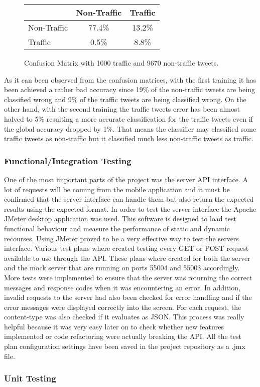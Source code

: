 \begin{figure}[h]
\begin{center}
    \begin{tabular}{| l || c | c | }
    \hline
          & Non-Traffic & Traffic \\ \hline \hline
        Non-Traffic & 77.4\% & 13.2\% \\ \hline
        Traffic & 0.5\% & 8.8\% \\ \hline
    \end{tabular}
    \caption{Confusion Matrix with 1000 traffic and 9670 non-traffic tweets.}
    \label{fig:confusionMatrix1}
\end{center}
\end{figure}
	
As it can been observed from the confusion matrices, with the first training it has been achieved a rather bad accuracy since 19\% of the non-traffic tweets are being classified wrong and 9\% of the traffic tweets are being classified wrong. On the other hand, with the second training the traffic tweets error has been almost halved to 5\% resulting a more accurate classification for the traffic tweets even if the global accuracy dropped by 1\%. That means the classifier may classified some traffic tweets as non-traffic but it classified much less non-traffic tweets as traffic.

\subsubsection{Functional/Integration Testing}
One of the most important parts of the project was the server API interface. A lot of requests will 
be coming from the mobile application and it must be confirmed that the server interface can handle 
them but also return the expected results using the expected format. In order to test the server 
interface the Apache JMeter desktop application was used. This software is designed to load test 
functional behaviour and measure the performance of static and dynamic recourses. Using JMeter 
proved to be a very effective way to test the servers interface. Various test plans where created 
testing every GET or POST request available to use through the API. These plans where created for 
both the server and the mock server that are running on ports 55004 and 55003 accordingly. More 
tests were implemented to ensure that the server was returning the correct messages and response 
codes when it was encountering an error. In addition, invalid requests to the server had also been 
checked for error handling and if the error messages were displayed correctly into the screen. For 
each request, the content-type was also checked if it evaluates as JSON. This process was really 
helpful because it was very easy later on to check whether new features implemented or code 
refactoring were actually breaking the API. All the test plan configuration settings have been saved 
in the project repository as a .jmx file. 

\subsubsection{Unit Testing} 

